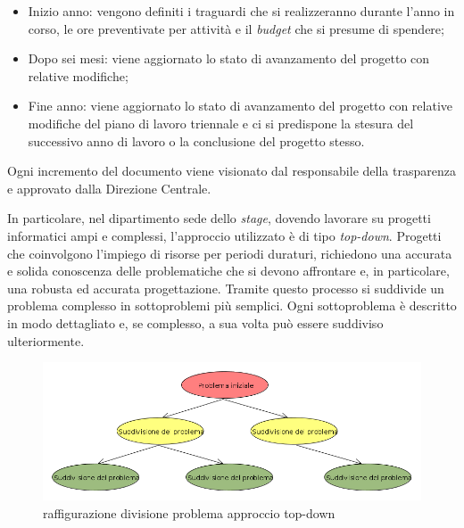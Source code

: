 \begin{itemize}
	\item Inizio anno: vengono definiti i traguardi che si realizzeranno durante l'anno in corso, le ore preventivate per attività e il \textit{budget} che si presume di spendere;
	\item Dopo sei mesi: viene aggiornato lo stato di avanzamento del progetto con relative modifiche;
	\item Fine anno: viene aggiornato lo stato di avanzamento del progetto con relative modifiche del piano di lavoro triennale e ci si predispone la stesura del successivo anno di lavoro o la conclusione del progetto stesso.
\end{itemize}

Ogni incremento del documento viene visionato dal responsabile della trasparenza e approvato dalla Direzione Centrale.



In particolare, nel dipartimento sede dello \textit{stage}, dovendo lavorare su progetti informatici ampi e complessi, l'approccio utilizzato è di tipo \textit{top-down}. Progetti che coinvolgono l'impiego di risorse per periodi duraturi, richiedono una accurata e solida conoscenza delle problematiche che si devono affrontare e, in particolare, una robusta ed accurata progettazione. Tramite questo processo si suddivide un problema complesso in sottoproblemi più semplici. Ogni sottoproblema è descritto in modo dettagliato e, se complesso, a sua volta può essere suddiviso ulteriormente.

\begin{figure}[htpb]
\includegraphics[scale=0.5]{./capitoli/capitolo1/img/probo}
\caption{raffigurazione divisione problema approccio top-down}
\end{figure}


